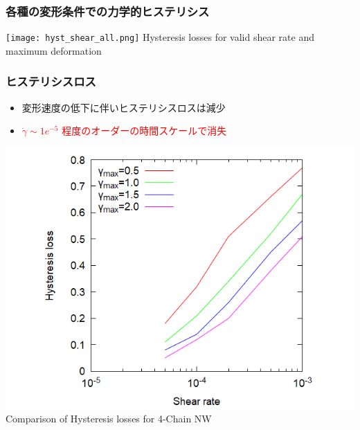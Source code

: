 \documentclass[12pt, dvipdfmx]{beamer}
\begin{document}
\begin{frame}
	\frametitle{各種の変形条件での力学的ヒステリシス}
		\centering
			\texttt{[image: hyst\_shear\_all.png]}
			Hysteresis losses for valid shear rate and maximum deformation
\end{frame}

\begin{frame}
	\frametitle{ヒステリシスロス}
	\begin{itemize}
		\item 変形速度の低下に伴いヒステリシスロスは減少
		\item \textcolor{red}{$\dot{\gamma} \sim 1e^{-5}$ 程度のオーダーの時間スケールで消失}
	\end{itemize}
			\centering
				\includegraphics[width=.6\textwidth]{hyst_shear.png}\\
					Comparison of Hysteresis losses for 4-Chain NW
\end{frame}
\end{document}
